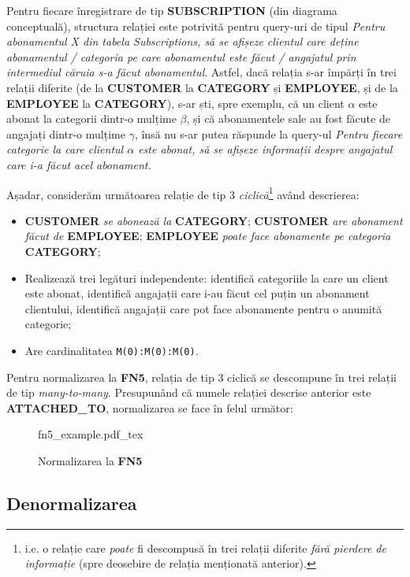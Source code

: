 \documentclass[a4paper, oneside, 12pt]{article}
\newcommand{\incfig}[1]{%
    \def\svgwidth{\columnwidth}
    {#1.pdf_tex}
}
\begin{document}
Pentru fiecare înregistrare de tip \textbf{SUBSCRIPTION} (din diagrama
conceptuală), structura relației este potrivită pentru query-uri de tipul
\emph{Pentru abonamentul X din tabela Subscriptions, să se afișeze clientul
care deține abonamentul / categoria pe care abonamentul este făcut / angajatul
prin intermediul căruia s-a făcut abonamentul}. Astfel, dacă relația s-ar
împărți în trei relații diferite (de la \textbf{CUSTOMER} la \textbf{CATEGORY}
și \textbf{EMPLOYEE}, și de la \textbf{EMPLOYEE} la \textbf{CATEGORY}), s-ar
ști, spre exemplu, că un client $\alpha$ este abonat la categorii dintr-o mulțime
$\beta$, și că abonamentele sale au fost făcute de angajați dintr-o mulțime
$\gamma$, însă nu s-ar putea răspunde la query-ul \emph{Pentru fiecare
categorie la care clientul $\alpha$ este abonat, să se afișeze informații
despre angajatul care i-a făcut acel abonament.}

Așadar, considerăm următoarea relație de tip 3 \emph{ciclică}\footnote{i.e. o
relație care \emph{poate} fi descompusă în trei relații diferite \emph{fără
pierdere de informație} (spre deosebire de relația menționată anterior).} având
descrierea:

\begin{itemize}[label=\textbullet, noitemsep, topsep=0pt, after=]
        \item \textbf{CUSTOMER} \emph{se abonează la} \textbf{CATEGORY};
              \textbf{CUSTOMER} \emph{are abonament făcut de} \textbf{EMPLOYEE};
              \textbf{EMPLOYEE} \emph{poate face abonamente pe categoria} \textbf{CATEGORY};
        \item Realizează trei legături independente: identifică
              categoriile la care un client este abonat, identifică
              angajații care i-au făcut cel puțin un abonament
              clientului, identifică angajații care pot face
              abonamente pentru o anumită categorie;
        \item Are cardinalitatea \texttt{M(0):M(0):M(0)}.

\end{itemize}

Pentru normalizarea la \textbf{FN5}, relația de tip 3 ciclică se
descompune în trei relații de tip \emph{many-to-many}. Presupunând că numele relației descrise
anterior este \textbf{ATTACHED\_TO}, normalizarea se face în felul următor:

\begin{figure}[H]
    \centering
    \incfig{fn5_example}
    \caption{Normalizarea la \textbf{FN5}}
    \label{fig:norm5}
\end{figure}

\subsection{Denormalizarea}
\end{document}
